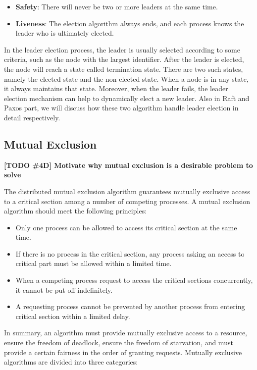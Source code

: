 \documentclass[12pt, a4paper]{article}
\newcommand{\todo}[2]{\textbf{\color{blue}[TODO \##1] #2}\par}
\begin{document}
\begin{itemize}
  \item \textbf{Safety}: There will never be two or more leaders at the same
  time.
  \item \textbf{Liveness}: The election algorithm always ends, and each process
  knows the leader who is ultimately elected.
\end{itemize}

In the leader election process, the leader is usually selected according to
some criteria, such as the node with the largest identifier\cite{effatparvar2010improved}. After the leader is elected, the node will reach a state called termination state. There are two such states, namely the elected state and the non-elected state. When a node is in any state, it always maintains that state. Moreover, when the leader fails, the leader election mechanism can help to dynamically elect a new leader. Also in Raft and Paxos part, we will discuss how these two algorithm handle leader election in detail respectively.

\subsection{Mutual Exclusion}
\todo{4D}{Motivate why mutual exclusion is a desirable problem to solve}
The distributed mutual exclusion algorithm guarantees mutually exclusive access
to a critical section among a number of competing
processes\cite{lamport1987fast}. A mutual exclusion algorithm should meet the
following principles\cite{velazques1993survey}:

\begin{itemize}
  \item \textbf{}Only one process can be allowed to access its critical
  section at the same time.
  \item \textbf{}If there is no process in the critical section, any
  process asking an access to critical part must be allowed within a limited
  time.
  \item \textbf{}When a competing process request to access the critical
  sections concurrently, it cannot be put off indefinitely.
  \item \textbf{}A requesting process cannot be prevented by another process
  from entering critical section within a limited delay.
\end{itemize}

In summary, an algorithm must provide mutually exclusive access to a resource,
ensure the freedom of deadlock, ensure the freedom of starvation, and must
provide a certain fairness in the order of granting requests. Mutually exclusive
algorithms are divided into three categories:
\end{document}
